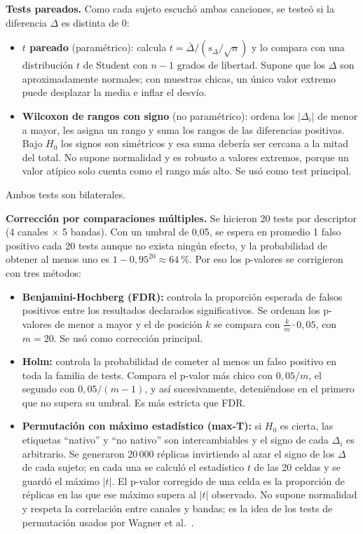 \documentclass[11pt,a4paper]{article}
\begin{document}
\textbf{Tests pareados.} Como cada sujeto escuchó ambas canciones, se testeó si la diferencia $\Delta$ es distinta de 0:
\begin{itemize}
  \item \textbf{$t$ pareado} (paramétrico): calcula $t = \bar\Delta / (s_\Delta/\sqrt{n})$ y lo compara con una distribución $t$ de Student con $n-1$ grados de libertad. Supone que los $\Delta$ son aproximadamente normales; con muestras chicas, un único valor extremo puede desplazar la media e inflar el desvío.
  \item \textbf{Wilcoxon de rangos con signo} (no paramétrico): ordena los $|\Delta_i|$ de menor a mayor, les asigna un rango y suma los rangos de las diferencias positivas. Bajo $H_0$ los signos son simétricos y esa suma debería ser cercana a la mitad del total. No supone normalidad y es robusto a valores extremos, porque un valor atípico solo cuenta como el rango más alto. Se usó como test principal.
\end{itemize}
Ambos tests son bilaterales.

\textbf{Corrección por comparaciones múltiples.} Se hicieron 20 tests por descriptor (4 canales $\times$ 5 bandas). Con un umbral de 0,05, se espera en promedio 1 falso positivo cada 20 tests aunque no exista ningún efecto, y la probabilidad de obtener al menos uno es $1 - 0{,}95^{20} \approx 64~\%$. Por eso los p-valores se corrigieron con tres métodos:
\begin{itemize}
  \item \textbf{Benjamini-Hochberg (FDR):} controla la proporción esperada de falsos positivos entre los resultados declarados significativos. Se ordenan los p-valores de menor a mayor y el de posición $k$ se compara con $\frac{k}{m}\cdot 0{,}05$, con $m = 20$. Se usó como corrección principal.
  \item \textbf{Holm:} controla la probabilidad de cometer al menos un falso positivo en toda la familia de tests. Compara el p-valor más chico con $0{,}05/m$, el segundo con $0{,}05/(m-1)$, y así sucesivamente, deteniéndose en el primero que no supera su umbral. Es más estricta que FDR.
  \item \textbf{Permutación con máximo estadístico (max-T):} si $H_0$ es cierta, las etiquetas ``nativo'' y ``no nativo'' son intercambiables y el signo de cada $\Delta_i$ es arbitrario. Se generaron 20\,000 réplicas invirtiendo al azar el signo de los $\Delta$ de cada sujeto; en cada una se calculó el estadístico $t$ de las 20 celdas y se guardó el máximo $|t|$. El p-valor corregido de una celda es la proporción de réplicas en las que ese máximo supera al $|t|$ observado. No supone normalidad y respeta la correlación entre canales y bandas; es la idea de los tests de permutación usados por Wagner et al.\ \cite{wagner}.
\end{itemize}
\end{document}
